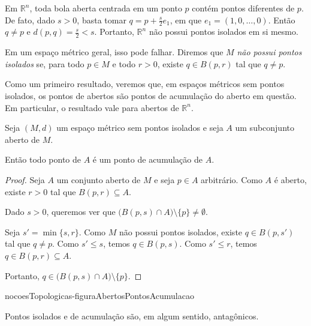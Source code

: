 Em $\mathbb R^n$, toda bola aberta centrada em um ponto $p$ contém pontos diferentes de $p$.
De fato, dado $s>0$, basta tomar $q=p+\frac{s}{2}e_1$, em que $e_1=(1,0,\dots,0)$.
Então $q\neq p$ e $d(p,q)=\frac{s}{2}<s$.
Portanto, $\mathbb R^n$ não possui pontos isolados em si mesmo.

Em um espaço métrico geral, isso pode falhar.
Diremos que $M$ \emph{não possui pontos isolados} se, para todo $p\in M$ e todo $r>0$, existe $q\in B(p,r)$ tal que $q\neq p$.

Como um primeiro resultado, veremos que, em espaços métricos sem pontos isolados, os pontos de abertos são pontos de acumulação do aberto em questão.
Em particular, o resultado vale para abertos de $\mathbb R^n$.

\begin{proposition}\label{prop:abertosPontosAcumulacao}
    Seja $(M,d)$ um espaço métrico sem pontos isolados e seja $A$ um subconjunto aberto de $M$.

    Então todo ponto de $A$ é um ponto de acumulação de $A$.
\end{proposition}
\begin{proof}
    Seja $A$ um conjunto aberto de $M$ e seja $p \in A$ arbitrário.
    Como $A$ é aberto, existe $r>0$ tal que $B(p, r)\subseteq A$.

    Dado $s>0$, queremos ver que $\bigl(B(p, s)\cap A\bigr)\setminus\{p\}\neq \emptyset$.

    Seja $s'=\min\{s, r\}$.
    Como $M$ não possui pontos isolados, existe $q\in B(p,s')$ tal que $q\neq p$.
    Como $s'\leq s$, temos $q\in B(p,s)$.
    Como $s'\leq r$, temos $q\in B(p,r)\subseteq A$.

    Portanto, $q\in \bigl(B(p, s)\cap A\bigr)\setminus\{p\}$.
\end{proof}

{nocoesTopologicas-figuraAbertosPontosAcumulacao}

Pontos isolados e de acumulação são, em algum sentido, antagônicos.

